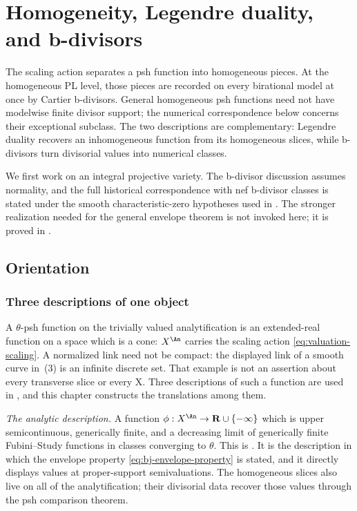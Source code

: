 \chapter{Homogeneity, Legendre duality, and b-divisors}
\label{chap:bj-homogeneity-bdivisors}

The scaling action separates a psh function into homogeneous pieces.
At the homogeneous PL level, those pieces are recorded on every
birational model at once by Cartier b-divisors. General homogeneous psh
functions need not have modelwise finite divisor support; the numerical
correspondence below concerns their exceptional subclass.  The two descriptions are complementary: Legendre duality
recovers an inhomogeneous function from its homogeneous slices, while
b-divisors turn divisorial values into numerical classes.

We first work on an integral projective variety.  The b-divisor discussion
assumes normality, and the full historical correspondence with nef
b-divisor classes is stated under the smooth characteristic-zero hypotheses
used in \cite[\S6.5]{BJ22}.  The stronger realization needed for the general
envelope theorem is not invoked here; it is proved in
.

\section{Orientation}
\label{sec:ch35-orientation}

\subsection{Three descriptions of one object}
\label{sec:ch35-three-descriptions}

A $\theta$-psh function on the trivially valued analytification is an
extended-real function on a space which is a cone: $X^{\An}$ carries the
scaling action \eqref{eq:valuation-scaling}. A normalized link need not be
compact: the displayed link of a smooth curve in
\,(3) is an infinite discrete set.
That example is not an assertion about every transverse slice or every X.  Three descriptions of
such a function are used in ,
and this chapter constructs the translations among them.

\emph{The analytic description.}  A function
$\phi:X^{\An}\to\mathbf R\cup\{-\infty\}$ which is upper semicontinuous,
generically finite, and a decreasing limit of generically finite
Fubini--Study functions in classes converging to $\theta$.  This is
.  It is the description in which the envelope property
\eqref{eq:bj-envelope-property} is stated, and it directly displays values at proper-support semivaluations.
The homogeneous slices also live on all of the analytification; their
divisorial data recover those values through the psh comparison theorem.

